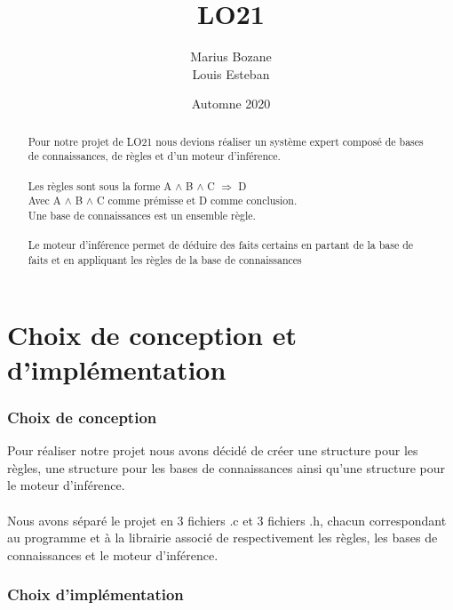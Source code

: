 \documentclass[12pt]{article}
\begin{document}
\title{LO21}
\author{Marius Bozane\\
Louis Esteban
}
\date {Automne 2020}
\maketitle

\begin{abstract}
	Pour notre projet de LO21 nous devions réaliser un système expert composé de bases de connaissances, de règles et d'un moteur d'inférence.\\
	\\	
	Les règles sont sous la forme A $\wedge$ B $\wedge$ C $\Rightarrow$ D\\
	Avec A $\wedge$ B $\wedge$ C comme prémisse et D comme conclusion.
	\\
	Une base de connaissances est un ensemble règle.\\
	\\
	Le moteur d'inférence permet de déduire des faits certains en partant de la base de faits et en appliquant les règles de la base de connaissances
\end{abstract}

\newpage
\tableofcontents
\newpage

\newpage

\part{Choix de conception et d'implémentation}

\newpage

\section{Choix de conception}
Pour réaliser notre projet nous avons décidé de créer une structure pour les règles, une structure pour les bases de connaissances ainsi qu'une structure pour le moteur d'inférence.\\
\\
Nous avons séparé le projet en 3 fichiers .c et 3 fichiers .h, chacun correspondant au programme et à la librairie associé de respectivement les règles, les bases de connaissances et le moteur d'inférence.
\\

\section{Choix d'implémentation}
\end{document}
